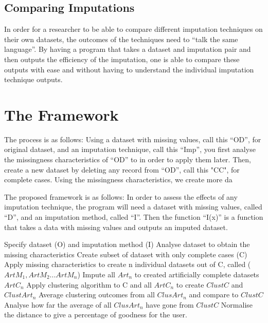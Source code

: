 \documentclass{IEEEconf}
\begin{document}


		\subsection{Comparing Imputations} %
		\label{sub:comparing_imputations}
			In order for a researcher to be able to compare different imputation techniques on their own datasets, the outcomes of the techniques need to ``talk the same language''. By having a program that takes a dataset and imputation pair and then outputs the efficiency of the imputation, one is able to compare these outputs with ease and without having to understand the individual imputation technique outputs. 

	\section{The Framework} %
	\label{sec:the_framework}
		The process is as follows: Using a dataset with missing values, call this ``OD'', for original dataset, and an imputation technique, call this ``Imp'', you first analyse the missingness characteristics of ``OD'' to in order to apply them later. Then, create a new dataset by deleting any record from ``OD'', call this "CC", for complete cases. Using the missingness characteristics, we create more da

		The proposed framework is as follows: In order to assess the effects of any imputation technique, the program will need a dataset with missing values, called ``D'', and an imputation method, called ``I''. Then the function ``I(x)'' is a function that takes a data with missing values and outputs an imputed dataset. 

		Specify dataset (O) and imputation method (I)
		Analyse dataset to obtain the missing characteristics
		Create subset of dataset with only complete cases (C)
		Apply missing characteristics to create n individual datasets out of C, called ($ArtM_{1}, ArtM_{2}...ArtM_{n}$)
		Impute all $Art_{n}$ to created artificially complete datasets $ArtC_{n}$
		Apply clustering algorithm to C and all $ArtC_{n}$ to create $ClustC$ and $ClustArt_{n}$
		Average clustering outcomes from all $ClusArt_{n}$ and compare to $ClustC$
		Analyse how far the average of all $ClusArt_{n}$ have gone from $ClustC$
		Normalise the distance to give a percentage of goodness for the user.
\end{document}
